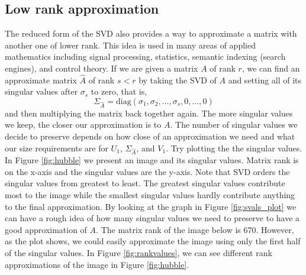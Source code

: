 \subsection*{Low rank approximation}
The reduced form of the SVD also provides a way to approximate a
matrix with another one of lower rank.
This idea is used in many areas of applied mathematics including signal processing, statistics, semantic indexing (search engines), and control theory.
If we are given a matrix $A$ of rank $r$, we can find an approximate matrix $\widehat A$ of rank $s<r$ by taking the SVD of $A$ and setting all of its singular values after $\sigma_s$ to zero, that is,
\begin{equation*}
\Sigma_{\widehat A} = \mbox{diag}(\sigma_1,\sigma_2,\ldots,\sigma_s,0,\ldots,0)
\end{equation*}
and then multiplying the matrix back together again.
The more singular values we keep, the closer our approximation is to $A$.
The number of singular values we decide to preserve depends on how close of an approximation we need and what our size requirements are for $U_1$, $\Sigma_{\widehat A}$, and $V_1$.
Try plotting the the singular values.
In Figure \ref{fig:hubble} we present an image and its singular values.
Matrix rank is on the x-axis and the singular values are the y-axis.
Note that SVD orders the singular values from greatest to least.
The greatest singular values contribute most to the image while the smallest singular values hardly contribute anything to the final approximation.
By looking at the graph in Figure \ref{fig:svals_plot} we can have a rough idea of how many singular values we need to preserve to have a good approximation of $A$.
The matrix rank of the image below is $670$.
However, as the plot shows, we could easily approximate the image using only the first half of the singular values.  In Figure \ref{fig:rankvalues}, we can see different rank approximations of the image in Figure \ref{fig:hubble}.
